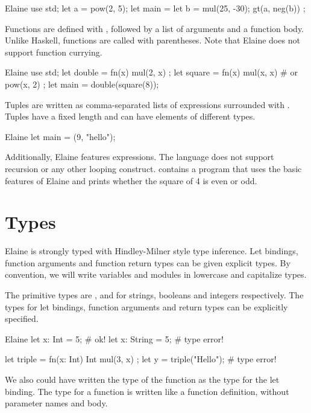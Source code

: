\begin{lst}{Elaine}
use std;
let a = pow(2, 5);
let main = {
    let b = mul(25, -30);
    gt(a, neg(b))
};
\end{lst}
%
Functions are defined with , followed by a list of arguments and a function body. Unlike Haskell, functions are called with parentheses. Note that Elaine does not support function currying.

\begin{lst}{Elaine}
use std;
let double = fn(x) {
    mul(2, x)
};
let square = fn(x) {
    mul(x, x) # or pow(x, 2)
};
let main = double(square(8));
\end{lst}
%
Tuples are written as comma-separated lists of expressions surrounded with \el{()}. Tuples have a fixed length and can have elements of different types.

\begin{lst}{Elaine}
let main = (9, "hello");
\end{lst}
%
Additionally, Elaine features  expressions. The language does not support recursion or any other looping construct.  contains a program that uses the basic features of Elaine and prints whether the square of 4 is even or odd. 


\section{Types}

Elaine is strongly typed with Hindley-Milner style type inference. Let bindings, function arguments and function return types can be given explicit types. By convention, we will write variables and modules in lowercase and capitalize types.

The primitive types are ,  and  for strings, booleans and integers respectively. The types for let bindings, function arguments and return types can be explicitly specified.

\begin{lst}{Elaine}
let x: Int = 5;       # ok!
let x: String = 5;    # type error!

let triple = fn(x: Int) Int { mul(3, x) };
let y = triple("Hello");  # type error!
\end{lst}
%
We also could have written the type of the function as the type for the let binding. The type for a function is written like a function definition, without parameter names and body.

